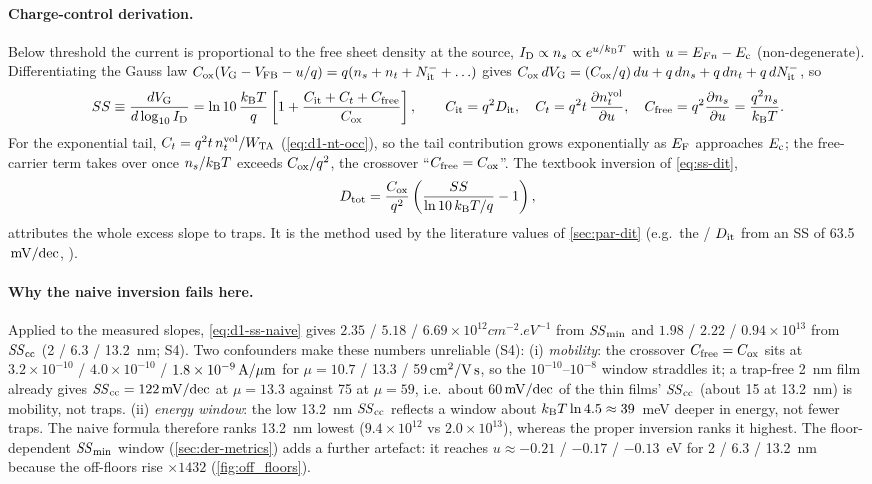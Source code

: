\paragraph{Charge-control derivation.}
Below threshold the current is proportional to the free sheet density at the source, $I_{\mathrm{D}}\propto n_s\propto
e^{u/k_{\mathrm{B}}T}$ with $u = E_{Fn}-E_{\mathrm{c}}$ (non-degenerate). Differentiating the Gauss law
$C_{\mathrm{ox}}(V_{\mathrm{G}} - V_{\mathrm{FB}} - u/q) = q(n_s + n_t + N_{\mathrm{it}}^{-} + \ldots)$ gives
$C_{\mathrm{ox}}\,dV_{\mathrm{G}} = (C_{\mathrm{ox}}/q)\,du + q\,dn_s + q\,dn_t + q\,dN_{\mathrm{it}}^{-}$, so
\begin{equation}
  SS \equiv \frac{dV_{\mathrm{G}}}{d\log_{10}I_{\mathrm{D}}}
     = \ln 10\,\frac{k_{\mathrm{B}}T}{q}\left[1 + \frac{C_{\mathrm{it}} + C_{t} + C_{\mathrm{free}}}{C_{\mathrm{ox}}}\right],\qquad
  C_{\mathrm{it}} = q^{2}D_{\mathrm{it}},\quad C_t = q^{2}t\,\frac{\partial n_t^{\mathrm{vol}}}{\partial u},\quad
  C_{\mathrm{free}} = q^{2}\frac{\partial n_s}{\partial u} = \frac{q^{2}n_s}{k_{\mathrm{B}}T}.
  \label{eq:ss-dit}
\end{equation}
For the exponential tail, $C_t = q^2 t\,n_t^{\mathrm{vol}}/W_{\mathrm{TA}}$ (\cref{eq:d1-nt-occ}), so the tail contribution grows
exponentially as $E_{\mathrm{F}}$ approaches $E_{\mathrm{c}}$; the free-carrier term takes over once $n_s/k_{\mathrm{B}}T$ exceeds $C_{\mathrm{ox}}/q^2$, the
crossover ``$C_{\mathrm{free}} = C_{\mathrm{ox}}$''. The textbook inversion of \cref{eq:ss-dit},
\begin{equation}
  D_{\mathrm{tot}} = \frac{C_{\mathrm{ox}}}{q^{2}}\left(\frac{SS}{\ln 10\,k_{\mathrm{B}}T/q} - 1\right),
  \label{eq:d1-ss-naive}
\end{equation}
attributes the whole excess slope to traps. It is the method used by the literature values of
\cref{sec:par-dit} (e.g.\ the \HfO/\InO{} $D_{\mathrm{it}}$ from an SS of 63.5$\,\mathrm{mV/dec}$, \citealp[p.~21539]{Lin2022}).

\paragraph{Why the naive inversion fails here.}
Applied to the measured slopes, \cref{eq:d1-ss-naive} gives $2.35$ / $5.18$ / $6.69\times10^{12}\si{cm^{-2}.eV^{-1}}$
from $\mathit{SS}_{\min}$ and $1.98$ / $2.22$ / $0.94\times10^{13}$ from $\mathit{SS}_{\mathrm{cc}}$ (2 / 6.3 / 13.2~nm; S4). Two confounders make these
numbers unreliable (S4): (i) \emph{mobility}: the crossover $C_{\mathrm{free}} = C_{\mathrm{ox}}$ sits at $3.2\times10^{-10}$ /
$4.0\times10^{-10}$ / $1.8\times10^{-9}\,\mathrm{A}/\mu\mathrm{m}$ for $\mu = 10.7$ / 13.3 / 59$\,\mathrm{cm}^{2}/\mathrm{V\,s}$, so the $10^{-10}$--$10^{-8}$ window
straddles it; a trap-free 2~nm film already gives $\mathit{SS}_{\mathrm{cc}} = 122\,\mathrm{mV/dec}$ at $\mu = 13.3$ against 75 at $\mu = 59$, i.e.\
about 60$\,\mathrm{mV/dec}$ of the thin films' $\mathit{SS}_{\mathrm{cc}}$ (about 15 at 13.2~nm) is mobility, not traps. (ii) \emph{energy window}:
the low 13.2~nm $\mathit{SS}_{\mathrm{cc}}$ reflects a window about $k_{\mathrm{B}}T\ln4.5 \approx 39$~meV deeper in energy, not fewer traps. The naive
formula therefore ranks 13.2~nm lowest ($9.4\times10^{12}$ vs $2.0\times10^{13}$), whereas the proper inversion ranks it
highest. The floor-dependent $\mathit{SS}_{\min}$ window (\cref{sec:der-metrics}) adds a further artefact: it reaches $u\approx-0.21$ / $-0.17$ / $-0.13$~eV
for 2 / 6.3 / 13.2~nm because the off-floors rise $\times1432$ (\cref{fig:off_floors}).

